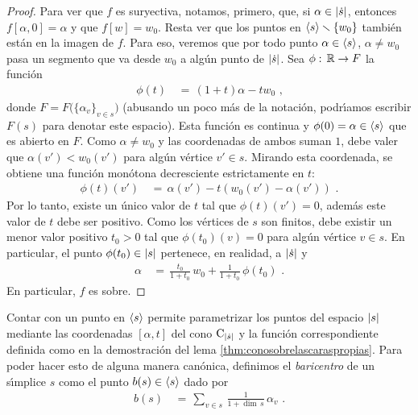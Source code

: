 \begin{proof}
	Para ver que $f$ es suryectiva, notamos, primero, que, si
	$\alpha\in\left|\dot{s}\right|$, entonces $f[\alpha,0]=\alpha$ y que
	$f[w]=w_{0}$. Resta ver que los puntos en
	$\langle s\rangle\smallsetminus\{w_{0}\}$ tambi\'{e}n est\'{a}n en la
	imagen de $f$. Para eso, veremos que por todo punto
	$\alpha\in\langle s\rangle$, $\alpha\not=w_{0}$ pasa un segmento
	que va desde $w_{0}$ a alg\'{u}n punto de $\left|\dot{s}\right|$.
	Sea $\phi:\,\mathbb{R}\rightarrow F$ la funci\'{o}n
	\begin{align*}
		\phi(t) & \,=\, (1+t)\alpha -tw_{0}
		\text{ ,}
	\end{align*}
	donde $F=F\big(\{\alpha_{v}\}_{v\in s}\big)$ (abusando un poco m\'{a}s
	de la notaci\'{o}n, podr\'{\i}amos escribir $F(s)$ para denotar este
	espacio). Esta funci\'{o}n es continua y
	$\phi(0)=\alpha\in\langle s\rangle$ que es abierto en $F$. Como
	$\alpha\not =w_{0}$ y las coordenadas de ambos suman $1$, debe valer
	que $\alpha(v')<w_{0}(v')$ para alg\'{u}n v\'{e}rtice $v'\in s$.
	Mirando esta coordenada, se obtiene una funci\'{o}n mon\'{o}tona
	decresciente estrictamente en $t$:
	\begin{align*}
		\phi(t)(v') & \,=\,\alpha(v') - t(w_{0}(v')-\alpha(v'))
		\text{ .}
	\end{align*}
	Por lo tanto, existe un \'{u}nico valor de $t$ tal que
	$\phi(t)(v')=0$, adem\'{a}s este valor de $t$ debe ser positivo.
	Como los v\'{e}rtices de $s$ son finitos, debe existir un menor
	valor positivo $t_{0}>0$ tal que $\phi(t_{0})(v)=0$ para alg\'{u}n
	v\'{e}rtice $v\in s$. En particular, el punto $\phi(t_{0})\in\left|s\right|$
	pertenece, en realidad, a $\left|\dot{s}\right|$ y
	\begin{align*}
		\alpha & \,=\,\frac{t_{0}}{1+t_{0}}\,w_{0}+
			\frac{1}{1+t_{0}}\,\phi(t_{0})
		\text{ .}
	\end{align*}
	En particular, $f$ es sobre.
\end{proof}

Contar con un punto en $\langle s\rangle$ permite parametrizar los
puntos del espacio $\left|s\right|$ mediante las coordenadas $[\alpha,t]$ del
cono $\mathrm{C}_{\left|\dot{s}\right|}$ y la funci\'{o}n correspondiente
definida como en la demostraci\'{o}n del lema
\ref{thm:conosobrelascaraspropias}. Para poder hacer esto de alguna manera
can\'{o}nica, definimos el \emph{baricentro} de un s\'{\i}mplice $s$ como
el punto $b(s)\in\langle s\rangle$ dado por
\begin{align*}
	b(s) & \,=\,\sum_{v\in s}\,\frac{1}{1+\dim\,s}\,\alpha_{v}
	\text{ .}
\end{align*}
%

